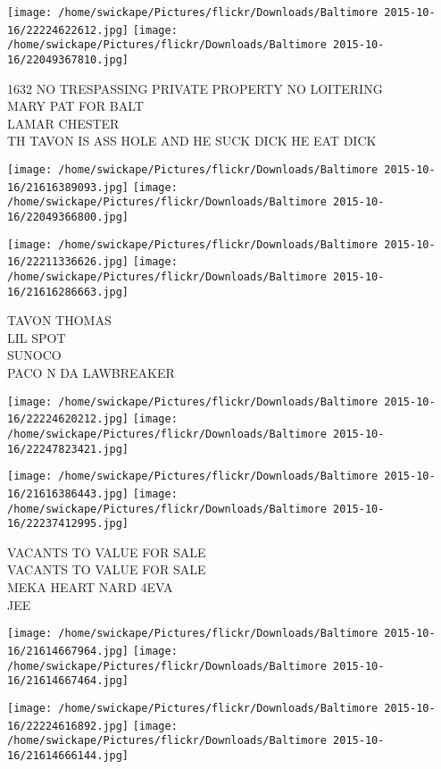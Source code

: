 \documentclass[10pt,letterpaper]{article}
\begin{document}
\texttt{[image: /home/swickape/Pictures/flickr/Downloads/Baltimore 2015-10-16/22224622612.jpg]}
\texttt{[image: /home/swickape/Pictures/flickr/Downloads/Baltimore 2015-10-16/22049367810.jpg]}

1632 NO TRESPASSING PRIVATE PROPERTY NO LOITERING\\
MARY PAT FOR BALT\\
LAMAR CHESTER\\
TH TAVON IS ASS HOLE AND HE SUCK DICK HE EAT DICK
\pagebreak

\texttt{[image: /home/swickape/Pictures/flickr/Downloads/Baltimore 2015-10-16/21616389093.jpg]}
\texttt{[image: /home/swickape/Pictures/flickr/Downloads/Baltimore 2015-10-16/22049366800.jpg]}

\texttt{[image: /home/swickape/Pictures/flickr/Downloads/Baltimore 2015-10-16/22211336626.jpg]}
\texttt{[image: /home/swickape/Pictures/flickr/Downloads/Baltimore 2015-10-16/21616286663.jpg]}

TAVON THOMAS\\
LIL SPOT\\
SUNOCO\\
PACO N DA LAWBREAKER
\pagebreak

\texttt{[image: /home/swickape/Pictures/flickr/Downloads/Baltimore 2015-10-16/22224620212.jpg]}
\texttt{[image: /home/swickape/Pictures/flickr/Downloads/Baltimore 2015-10-16/22247823421.jpg]}

\texttt{[image: /home/swickape/Pictures/flickr/Downloads/Baltimore 2015-10-16/21616386443.jpg]}
\texttt{[image: /home/swickape/Pictures/flickr/Downloads/Baltimore 2015-10-16/22237412995.jpg]}

VACANTS TO VALUE FOR SALE\\
VACANTS TO VALUE FOR SALE\\
MEKA HEART NARD 4EVA\\
JEE
\pagebreak

\texttt{[image: /home/swickape/Pictures/flickr/Downloads/Baltimore 2015-10-16/21614667964.jpg]}
\texttt{[image: /home/swickape/Pictures/flickr/Downloads/Baltimore 2015-10-16/21614667464.jpg]}

\texttt{[image: /home/swickape/Pictures/flickr/Downloads/Baltimore 2015-10-16/22224616892.jpg]}
\texttt{[image: /home/swickape/Pictures/flickr/Downloads/Baltimore 2015-10-16/21614666144.jpg]}
\end{document}
